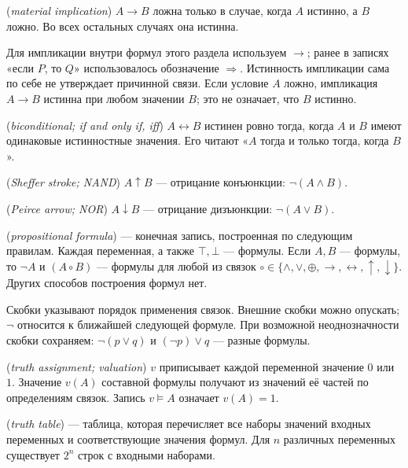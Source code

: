 \begin{definition} (\emph{material implication}) \(A\to B\) ложна только в случае, когда \(A\) истинно, а \(B\) ложно. Во всех остальных случаях она истинна.\end{definition}
Для импликации внутри формул этого раздела используем \(\to\); ранее в записях «если \(P\), то \(Q\)» использовалось обозначение \(\Rightarrow\). Истинность импликации сама по себе не утверждает причинной связи. Если условие \(A\) ложно, импликация \(A\to B\) истинна при любом значении \(B\); это не означает, что \(B\) истинно.
\begin{definition} (\emph{biconditional; if and only if, iff}) \(A\leftrightarrow B\) истинен ровно тогда, когда \(A\) и \(B\) имеют одинаковые истинностные значения. Его читают «\(A\) тогда и только тогда, когда \(B\)».\end{definition}
\begin{definition} (\emph{Sheffer stroke; NAND}) \(A\uparrow B\) — отрицание конъюнкции: \(\neg(A\land B)\).\end{definition}
\begin{definition} (\emph{Peirce arrow; NOR}) \(A\downarrow B\) — отрицание дизъюнкции: \(\neg(A\lor B)\).\end{definition}

\begin{definition} (\emph{propositional formula}) — конечная запись, построенная по следующим правилам. Каждая переменная, а также \(\top,\bot\) — формулы. Если \(A,B\) — формулы, то \(\neg A\) и \((A\circ B)\) — формулы для любой из связок \(\circ\in\{\land,\lor,\oplus,\to,\leftrightarrow,\uparrow,\downarrow\}\). Других способов построения формул нет.\end{definition}
Скобки указывают порядок применения связок. Внешние скобки можно опускать; \(\neg\) относится к ближайшей следующей формуле. При возможной неоднозначности скобки сохраняем: \(\neg(p\lor q)\) и \((\neg p)\lor q\) — разные формулы.
\begin{definition} (\emph{truth assignment; valuation}) \(v\) приписывает каждой переменной значение \(0\) или \(1\). Значение \(v(A)\) составной формулы получают из значений её частей по определениям связок. Запись \(v\models A\) означает \(v(A)=1\).\end{definition}
\begin{definition} (\emph{truth table}) — таблица, которая перечисляет все наборы значений входных переменных и соответствующие значения формул. Для \(n\) различных переменных существует \(2^n\) строк с входными наборами.\end{definition}


